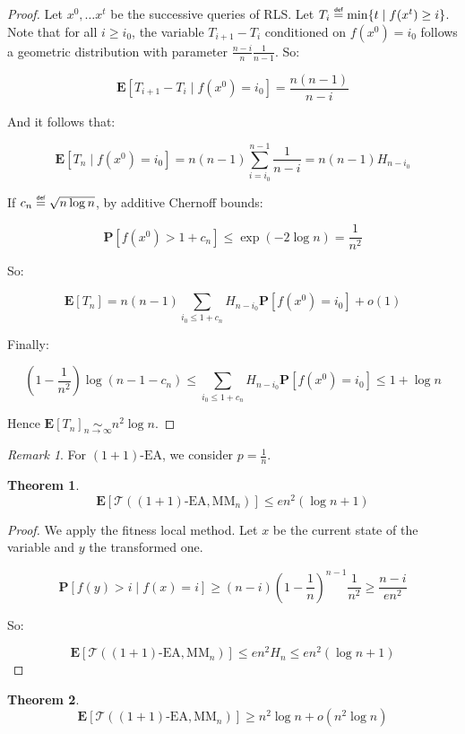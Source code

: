 \documentclass[12pt]{article}
\theoremstyle{definition}
\theoremstyle{plain}
\newtheorem*{theorem}{Theorem}
\theoremstyle{remark}
\newtheorem*{remark}{Remark}
\newcommand{\myequiv}[1]{\underset{#1}{\sim}}
\newcommand\mydef{\mathrel{\overset{\makebox[0pt]{\mbox{\normalfont\tiny\sffamily def}}}{=}}}
\begin{document}
\begin{proof}
    Let $x^0, \ldots x^t$ be the successive queries of RLS.
    Let $T_i\mydef \min\{t\mid f(x^t)\ge i\}$. Note that for all $i\ge i_0$, the
    variable $T_{i+1}-T_i$ conditioned on $f(x^0)=i_0$ follows a geometric distribution
    with parameter $\frac{n-i}{n}\frac{1}{n-1}$. So:

    $$\mathbf{E}[T_{i+1}-T_i\mid f(x^0)=i_0]=\frac{n(n-1)}{n-i}$$
    
    And it follows that:
    
    $$\mathbf{E}[T_{n}\mid f(x^0)=i_0]=n(n-1)\sum_{i=i_0}^{n-1} \frac{1}{n-i}=n(n-1)H_{n-i_0}$$

    If $c_n\mydef \sqrt{n\log n}$, by additive Chernoff bounds:

    $$\mathbf{P}[f(x^0)> 1+c_n]\le \exp(-2\log n)=\frac{1}{n^2}$$

    So:

    $$\mathbf{E}[T_n]=n(n-1)\sum_{i_0\le 1+c_n} H_{n-i_0} \mathbf{P}[f(x^0)=i_0]+o(1)$$

    Finally:

    $$\left(1-\frac{1}{n^2}\right)\log(n-1-c_n)\le \sum_{i_0\le 1+c_n} H_{n-i_0} \mathbf{P}[f(x^0)=i_0]\le 1+\log n$$
    
    Hence $\mathbf{E}[T_n]\myequiv{n\to\infty} n^2\log n$.\qedhere

\end{proof}

\begin{remark}
    For $(1+1)\text{-EA}$, we consider $p=\frac{1}{n}$.
\end{remark}

\begin{theorem}
    $$\mathbf{E}[\mathcal{T}((1+1)\text{-EA},\text{MM}_n)]\le e n^2 (\log n+1)$$
\end{theorem}

\begin{proof}
    We apply the fitness local method. Let $x$ be the current state of the variable and $y$ the transformed one. 

    $$\mathbf{P}[f(y)>i\mid f(x)=i]\ge (n-i)\left(1-\frac{1}{n}\right)^{n-1} \frac{1}{n^2}\ge \frac{n-i}{e n^2}$$

    So:

    $$\mathbf{E}[\mathcal{T}((1+1)\text{-EA},\text{MM}_n)]\le e n^2 H_n\le e n^2(\log n+1)$$\qedhere
\end{proof}

\begin{theorem}
    $$\mathbf{E}[\mathcal{T}((1+1)\text{-EA},\text{MM}_n)]\ge n^2 \log n+o(n^2\log n)$$
\end{theorem}
\end{document}
